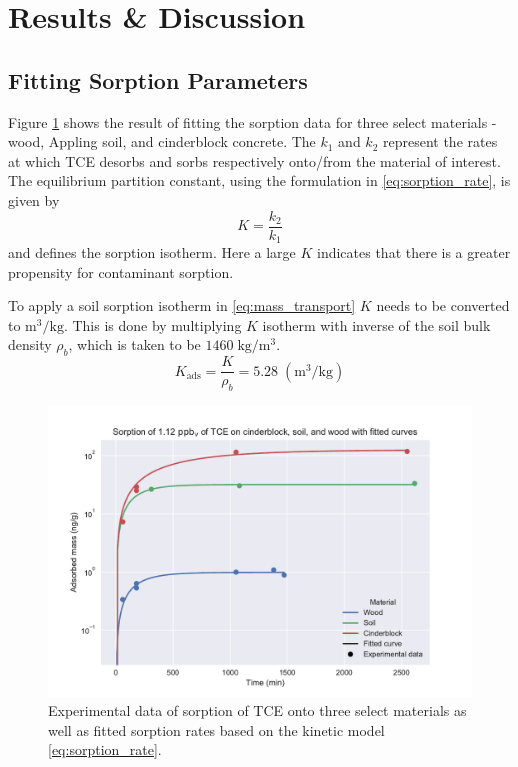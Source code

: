 \section{Results \& Discussion}\label{sec:results}

\subsection{Fitting Sorption Parameters}\label{sec:results_sorption_fit}
Figure \ref{fig:sorption_fit} shows the result of fitting the sorption data for three select materials - wood, Appling soil, and cinderblock concrete.
The $k_1$ and $k_2$ represent the rates at which TCE desorbs and sorbs respectively onto/from the material of interest.
The equilibrium partition constant, using the formulation in \eqref{eq:sorption_rate}, is given by
\begin{equation}
  K = \frac{k_2}{k_1}
\end{equation}
and defines the sorption isotherm.
Here a large $K$ indicates that there is a greater propensity for contaminant sorption.\par

To apply a soil sorption isotherm in \eqref{eq:mass_transport} $K$ needs to be converted to $\mathrm{m^3/kg}$.
This is done by multiplying $K$ isotherm with inverse of the soil bulk density $\rho_b$, which is taken to be $1460 \; \mathrm{kg/m^3}$. %
\begin{equation}
  K_\mathrm{ads} = \frac{K}{\rho_b} = 5.28 \; \mathrm{(m^3/kg)}
\end{equation}

\begin{figure}[htb!]
  \includegraphics[width=\textwidth]{sorption_fit.pdf}
  \caption{Experimental data of sorption of TCE onto three select materials as well as fitted sorption rates based on the kinetic model \eqref{eq:sorption_rate}.}
  \label{fig:sorption_fit}
\end{figure}

